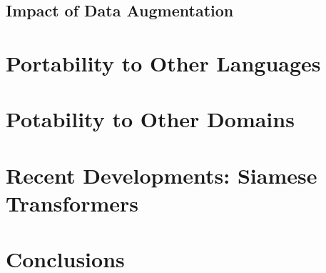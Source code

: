 \subsection{Impact of Data Augmentation}



\section{Portability to Other Languages}

\section{Potability to Other Domains}

\section{Recent Developments: Siamese Transformers}

\section{Conclusions}